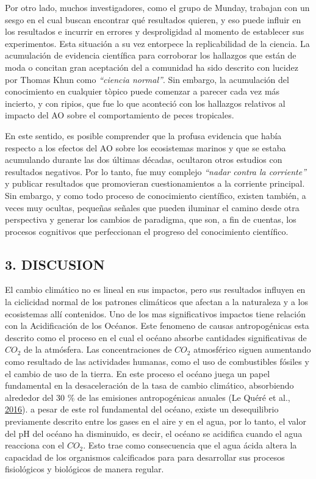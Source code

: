 \documentclass[
]{article}
\begin{document}
Por otro lado, muchos investigadores, como el grupo de Munday, trabajan
con un sesgo en el cual buscan encontrar qué resultados quieren, y eso
puede influir en los resultados e incurrir en errores y desproligidad al
momento de establecer sus experimentos. Esta situación a su vez
entorpece la replicabilidad de la ciencia. La acumulación de evidencia
científica para corroborar los hallazgos que están de moda o concitan
gran aceptación del a comunidad ha sido descrito con lucidez por Thomas
Khun como \emph{``ciencia normal''}. Sin embargo, la acumulación del
conocimiento en cualquier tòpico puede comenzar a parecer cada vez más
incierto, y con ripios, que fue lo que aconteció con los hallazgos
relativos al impacto del AO sobre el comportamiento de peces tropicales.

En este sentido, es posible comprender que la profusa evidencia que
había respecto a los efectos del AO sobre los ecosistemas marinos y que
se estaba acumulando durante las dos últimas décadas, ocultaron otros
estudios con resultados negativos. Por lo tanto, fue muy complejo
\emph{``nadar contra la corriente''} y publicar resultados que
promovieran cuestionamientos a la corriente principal. Sin embargo, y
como todo proceso de conocimiento científico, existen también, a veces
muy ocultas, pequeñas señales que pueden iluminar el camino desde otra
perspectiva y generar los cambios de paradigma, que son, a fin de
cuentas, los procesos cognitivos que perfeccionan el progreso del
conocimiento científico.

\pagebreak

\hypertarget{discusion}{%
\subsection{3. DISCUSION}\label{discusion}}

El cambio climático no es lineal en sus impactos, pero sus resultados
influyen en la ciclicidad normal de los patrones climáticos que afectan
a la naturaleza y a los ecosistemas allí contenidos. Uno de los mas
significativos impactos tiene relación con la Acidificación de los
Océanos. Este fenomeno de causas antropogénicas esta descrito como el
proceso en el cual el océano absorbe cantidades significativas de
\({CO}_{2}\) de la atmósfera. Las concentraciones de \({CO}_{2}\)
atmosférico siguen aumentando como resultado de las actividades humanas,
como el uso de combustibles fósiles y el cambio de uso de la tierra. En
este proceso el océano juega un papel fundamental en la desaceleración
de la tasa de cambio climático, absorbiendo alrededor del 30 \% de las
emisiones antropogénicas anuales (Le Quéré et al.,
\protect\hyperlink{ref-LeQuere2016}{2016}). a pesar de este rol
fundamental del océano, existe un desequilibrio previamente descrito
entre los gases en el aire y en el agua, por lo tanto, el valor del pH
del océano ha disminuido, es decir, el océano se acidifica cuando el
agua reacciona con el \({CO}_{2}\). Esto trae como consecuencia que el
agua ácida altera la capacidad de los organismos calcificados para para
desarrollar sus procesos fisiológicos y biológicos de manera regular.
\end{document}
